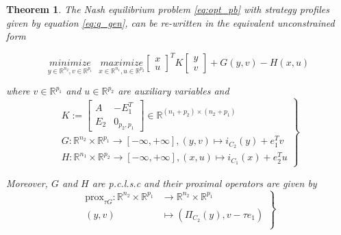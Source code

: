 \documentclass{article} %
\newtheorem{theorem}{Theorem} \newtheorem{lemma}[theorem]{Lemma}
\begin{document}
\begin{theorem}
  The Nash equilibrium problem \eqref{eq:opt_pb} with strategy profiles given by  equation \eqref{eq:q_gen}, can be re-written in the equivalent unconstrained form
  
  \begin{equation}
    \underset{y \in \mathbb{R}^{n_2}, v\in \mathbb{R}^{p_1}}{minimize}\text{ }\underset{x \in \mathbb{R}^{n_1}, u \in \mathbb{R}^{p_2}}{maximize}
           {\begin{bmatrix}x\\u\end{bmatrix}^TK\begin{bmatrix}y\\v\end{bmatrix} + G(y, v) - H(x, u)}
           \label{eq:unconstrained_pb}
  \end{equation}

  where $v \in \mathbb{R}^{p_1}$ and $u \in \mathbb{R}^{p_2}$ are auxiliary variables and 
  \begin{equation}
    \left .
    \begin{split}
      K :=
      \left[
        \begin{array}{c|c}
          A & -E_1^T \\ \hline
          E_2 & 0_{p_2, p_1}
        \end{array}
        \right] \in \mathbb{R}^{(n_1 + p_2) \times (n_2 + p_1)} \\
      G: \mathbb{R}^{n_2} \times \mathbb{R}^{p_1} \rightarrow [-\infty, +\infty], (y, v) \mapsto i_{C_2}(y) + e_1^Tv\\
      H: \mathbb{R}^{n_1} \times \mathbb{R}^{p_2} \rightarrow [-\infty, +\infty], (x, u) \mapsto i_{C_1}(x) + e_2^Tu
    \end{split}
    \right\}
    \label{eq:things}
  \end{equation}
  
  Moreover, $G$ and $H$ are \textit{p.c.l.s.c} and their proximal operators are given by
  \begin{equation}
    \left .
    \begin{split}
      \text{prox}_{\tau G} : \mathbb{R}^{n_2} \times \mathbb{R}^{p_1} &\rightarrow \mathbb{R}^{n_2} \times \mathbb{R}^{p_1}\\
      (y, v) &\mapsto (\Pi_{C_2}(y), v - \tau e_1)\\
    \end{split}
    \right\}
  \end{equation}


\end{theorem}
\end{document}
